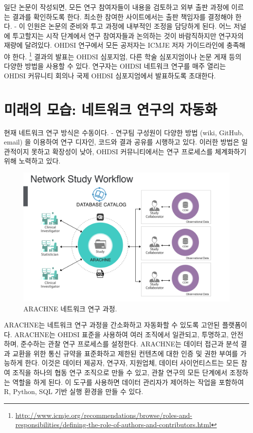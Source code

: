 \documentclass[11pt]{book}
\let\rmarkdownfootnote\footnote%
\def\footnote{\protect\rmarkdownfootnote}
\theoremstyle{definition}
\theoremstyle{definition}
\theoremstyle{definition}
\theoremstyle{remark}
\begin{document}
일단 논문이 작성되면, 모든 연구 참여자들이 내용을 검토하고 외부 출판
과정에 이르는 결과를 확인하도록 한다. 최소한 참여한 사이트에서는 출판
책임자를 결정해야 한다. - 이 인원은 논문의 준비와 투고 과정에 내부적인
조정을 담당하게 된다. 어느 저널에 투고할지는 시작 단계에서 연구
참여자들과 논의하는 것이 바람직하지만 연구자의 재량에 달려있다. OHDSI
연구에서 모든 공저자는 ICMJE 저자 가이드라인에 충족해야 한다. \footnote{\url{http://www.icmje.org/recommendations/browse/roles-and-responsibilities/defining-the-role-of-authors-and-contributors.html}}
결과의 발표는 OHDSI 심포지엄, 다른 학술 심포지엄이나 논문 게재 등의
다양한 방법을 사용할 수 있다. 연구자는 OHDSI 네트워크 연구를 매주 열리는
OHDSI 커뮤니티 회의나 국제 OHDSI 심포지엄에서 발표하도록 초대한다.

\section{미래의 모습: 네트워크 연구의 자동화}\label{----}


현재 네트워크 연구 방식은 수동이다. - 연구팀 구성원이 다양한 방법 (wiki,
GitHub, email) 을 이용하여 연구 디자인, 코드와 결과 공유를 시행하고
있다. 이러한 방법은 일관적이지 못하고 확장성이 낮아, OHDSI
커뮤니티에서는 연구 프로세스를 체계화하기 위해 노력하고 있다.

\begin{figure}[h]

{\centering \includegraphics[width=0.9\linewidth]{images/NetworkStudies/ARACHNE} 

}

\caption{ARACHNE 네트워크 연구 과정.}\label{fig:arachne}
\end{figure}

ARACHNE는 네트워크 연구 과정을 간소화하고 자동화할 수 있도록 고안된
플랫폼이다. ARACHNE는 OHDSI 표준을 사용하여 여러 조직에서 일관되고,
투명하고, 안전하며, 준수하는 관찰 연구 프로세스를 설정한다. ARACHNE는
데이터 접근과 분석 결과 교환을 위한 통신 규약을 표준화하고 제한된
컨텐츠에 대한 인증 및 권한 부여를 가능하게 한다. 이것은 데이터 제공자,
연구자, 지원업체, 데이터 사이언티스트는 모든 참여 조직을 하나의 협동
연구 조직으로 만들 수 있고, 관찰 연구의 모든 단계에서 조정하는 역할을
하게 된다. 이 도구를 사용하면 데이터 관리자가 제어하는 작업을 포함하여
R, Python, SQL 기반 실행 환경을 만들 수 있다.
\end{document}
